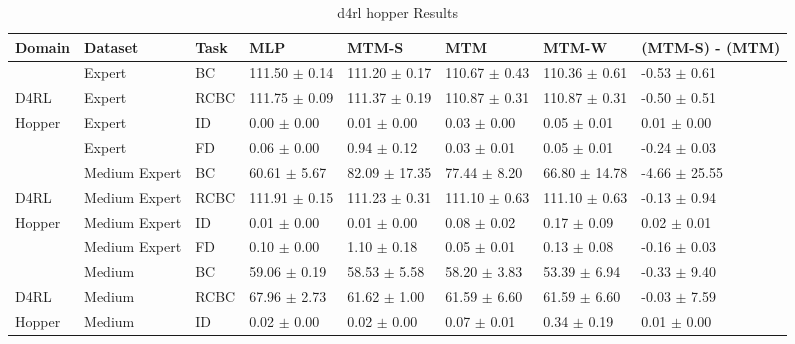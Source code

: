 \begin{table*}
  \small
  \caption{d4rl hopper Results}
  \label{tab:d4rl_hopper}
  \centering
  \begin{tabular}{l l l l l l l l}
    \toprule
Domain &       Dataset & Task &               MLP &             MTM-S &               MTM &             MTM-W &                                    (MTM-S) - (MTM) \\
    \midrule
       &        Expert &   BC & 111.50 $\pm$ 0.14 & 111.20 $\pm$ 0.17 & 110.67 $\pm$ 0.43 & 110.36 $\pm$ 0.61 &  \textcolor[rgb]{0.23,0.00,0.00}{-0.53 $\pm$ 0.61} \\
  D4RL &        Expert & RCBC & 111.75 $\pm$ 0.09 & 111.37 $\pm$ 0.19 & 110.87 $\pm$ 0.31 & 110.87 $\pm$ 0.31 &  \textcolor[rgb]{0.21,0.00,0.00}{-0.50 $\pm$ 0.51} \\
Hopper &        Expert &   ID &   0.00 $\pm$ 0.00 &   0.01 $\pm$ 0.00 &   0.03 $\pm$ 0.00 &   0.05 $\pm$ 0.01 &   \textcolor[rgb]{0.00,0.00,0.00}{0.01 $\pm$ 0.00} \\
       &        Expert &   FD &   0.06 $\pm$ 0.00 &   0.94 $\pm$ 0.12 &   0.03 $\pm$ 0.01 &   0.05 $\pm$ 0.01 &  \textcolor[rgb]{0.00,0.08,0.00}{-0.24 $\pm$ 0.03} \\
    \midrule
       & Medium Expert &   BC &  60.61 $\pm$ 5.67 & 82.09 $\pm$ 17.35 &  77.44 $\pm$ 8.20 & 66.80 $\pm$ 14.78 & \textcolor[rgb]{1.00,0.00,0.00}{-4.66 $\pm$ 25.55} \\
  D4RL & Medium Expert & RCBC & 111.91 $\pm$ 0.15 & 111.23 $\pm$ 0.31 & 111.10 $\pm$ 0.63 & 111.10 $\pm$ 0.63 &  \textcolor[rgb]{0.02,0.00,0.00}{-0.13 $\pm$ 0.94} \\
Hopper & Medium Expert &   ID &   0.01 $\pm$ 0.00 &   0.01 $\pm$ 0.00 &   0.08 $\pm$ 0.02 &   0.17 $\pm$ 0.09 &   \textcolor[rgb]{0.00,0.00,0.00}{0.02 $\pm$ 0.01} \\
       & Medium Expert &   FD &   0.10 $\pm$ 0.00 &   1.10 $\pm$ 0.18 &   0.05 $\pm$ 0.01 &   0.13 $\pm$ 0.08 &  \textcolor[rgb]{0.00,0.04,0.00}{-0.16 $\pm$ 0.03} \\
    \midrule
       &        Medium &   BC &  59.06 $\pm$ 0.19 &  58.53 $\pm$ 5.58 &  58.20 $\pm$ 3.83 &  53.39 $\pm$ 6.94 &  \textcolor[rgb]{0.12,0.00,0.00}{-0.33 $\pm$ 9.40} \\
  D4RL &        Medium & RCBC &  67.96 $\pm$ 2.73 &  61.62 $\pm$ 1.00 &  61.59 $\pm$ 6.60 &  61.59 $\pm$ 6.60 &                                   -0.03 $\pm$ 7.59 \\
Hopper &        Medium &   ID &   0.02 $\pm$ 0.00 &   0.02 $\pm$ 0.00 &   0.07 $\pm$ 0.01 &   0.34 $\pm$ 0.19 &   \textcolor[rgb]{0.00,0.00,0.00}{0.01 $\pm$ 0.00} \\

\end{tabular}
\end{table*}
